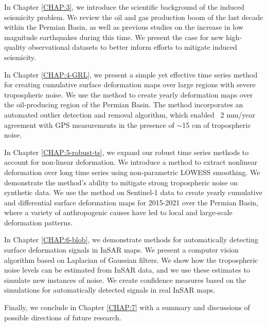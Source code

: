 In Chapter \ref{CHAP:3}, we introduce the scientific background of the induced seismicity problem. We review the oil and gas production boom of the last decade within the Permian Basin, as well as previous studies on the increase in low magnitude earthquakes during this time. We present the case for new high-quality observational datasets to better inform efforts to mitigate induced seismicity.


In Chapter \ref{CHAP:4-GRL}, we present a simple yet effective time series method for creating cumulative surface deformation maps over large regions with severe tropospheric noise. We use the method to create yearly deformation maps over the oil-producing region of the Permian Basin. The method incorporates an automated outlier detection and removal algorithm, which enabled ~2 mm/year agreement with GPS measurements in the presence of $\sim$15 cm of tropospheric noise.


In Chapter \ref{CHAP:5-robust-ts}, we expand our robust time series methods to account for non-linear deformation. We introduce a method to extract nonlinear deformation over long time series using non-parametric LOWESS smoothing. We demonstrate the method's ability to mitigate strong tropospheric noise on synthetic data. We use the method on Sentinel-1 data to create yearly cumulative and differential surface deformation maps for 2015-2021 over the Permian Basin, where a variety of anthropogenic causes have led to local and large-scale deformation patterns.


In Chapter \ref{CHAP:6-blob}, we demonstrate methods for automatically detecting surface deformation signals in InSAR maps. We present a computer vision algorithm based on Laplacian of Gaussian filters. We show how the tropospheric noise levels can be estimated from InSAR data, and we use these estimates to simulate new instances of noise. We create confidence measures based on the simulations for automatically detected signals in real InSAR maps.


Finally, we conclude in Chapter \ref{CHAP:7} with a summary and discussions of possible directions of future research.

